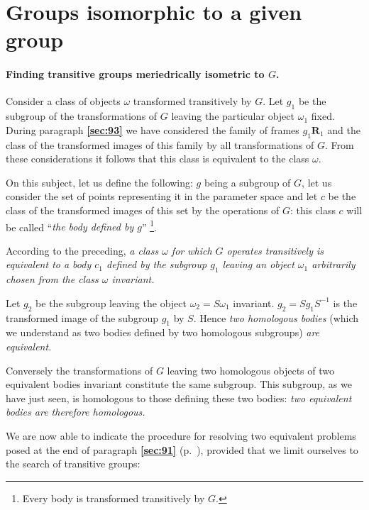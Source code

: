\documentclass[leqno,11pt]{book}
\numberwithin{equation}{chapter}
\theoremstyle{shape1}
\theoremstyle{shapesmall}
\newcommand{\fsref}[1]{{\rm\textsection\textbf{\ref{sec:#1}}}}
\begin{document}
\section{Groups isomorphic to a given group}
\label{sec:groups-isom-given}

\paragraph{Finding transitive groups meriedrically isometric to $G$.}
\label{sec:95}
Consider a class of objects $\omega$ transformed transitively by $G$. Let $g_{1}$ be the subgroup of the transformations of $G$ leaving the particular object $\omega_{1}$ fixed. During paragraph \fsref{93} we have considered the family of frames $g_{1}\mathbf{R}_{1}$ and the class of the transformed images of this family by all transformations of $G$. From these considerations it follows that this class is equivalent to the class $\omega$.

On this subject, let us define the following: $g$ being a subgroup of $G$, let us consider the set of points representing it in the parameter space and let $c$ be the class of the transformed images of this set by the operations of $G$: this class $c$ will be called ``\emph{the body defined by $g$}'' \footnote{Every body is transformed transitively by $G$.}.

According to the preceding, \emph{a class $\omega$ for which $G$ operates transitively is equivalent to a body $c_{1}$ defined by the subgroup $g_{1}$ leaving an object $\omega_{1}$ arbitrarily chosen from the class $\omega$ invariant.}

Let $g_{2}$ be the subgroup leaving the object $\omega_{2}=S\omega_{1}$ invariant. $g_{2}=Sg_{1}S^{-1}$ is the transformed image of the subgroup $g_{1}$ by $S$. Hence \emph{two homologous bodies} (which we understand as two bodies defined by two homologous subgroups) \emph{are equivalent.}

Conversely the transformations of $G$ leaving two homologous objects of two equivalent bodies invariant constitute the same subgroup. This subgroup, as we have just seen, is homologous to those defining these two bodies: \emph{two equivalent bodies are therefore homologous.}

We are now able to indicate the procedure for resolving two equivalent problems posed at the end of paragraph \fsref{91} (p.~\pageref{sec:91}), provided that we limit ourselves to the search of transitive groups:
\end{document}
